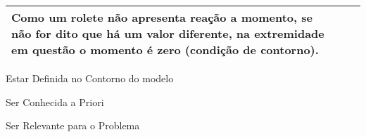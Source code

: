 \documentclass{article}
\begin{document}
\begin{table}[h]
\begin{tabularx}{\textwidth}{|X|X|X|}
                    \begin{minipage}{.3\textwidth}
                        \vspace{5px}
                        Como um rolete não apresenta reação a momento, \textbf{se não for dito que há um valor diferente}, na extremidade em questão o momento é zero (condição de contorno).
                    \end{minipage} \\ \hline    
            \end{tabularx}
        \end{table}

        \begin{todolist}\tiny
            \item Estar Definida no Contorno do modelo 
            \item Ser Conhecida a Priori
            \item Ser Relevante para o Problema
        \end{todolist}
\end{document}

